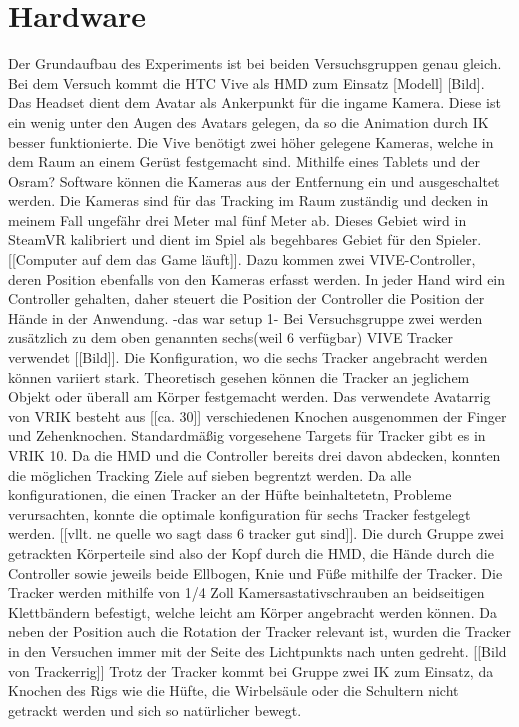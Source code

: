 \section{Hardware}
Der Grundaufbau des Experiments ist bei beiden Versuchsgruppen genau gleich.
Bei dem Versuch kommt die HTC Vive als HMD zum Einsatz [Modell] [Bild]. Das Headset dient dem Avatar als Ankerpunkt für die ingame Kamera. Diese ist ein wenig unter den Augen des Avatars gelegen, da so die Animation durch IK besser funktionierte.
Die Vive benötigt zwei höher gelegene Kameras, welche in dem Raum an einem Gerüst festgemacht sind. Mithilfe eines Tablets und der Osram? Software können die Kameras aus der Entfernung ein und ausgeschaltet werden. Die Kameras sind für das Tracking im Raum zuständig und decken in meinem Fall ungefähr drei Meter mal fünf Meter ab. Dieses Gebiet wird in SteamVR kalibriert und dient im Spiel als begehbares Gebiet für den Spieler. [[Computer auf dem das Game läuft]].
Dazu kommen zwei VIVE-Controller, deren Position ebenfalls von den Kameras erfasst werden. In jeder Hand wird ein Controller gehalten, daher steuert die Position der Controller die Position der Hände in der Anwendung. 
-das war setup 1-
Bei Versuchsgruppe zwei werden zusätzlich zu dem oben genannten sechs(weil 6 verfügbar) VIVE Tracker verwendet [[Bild]]. Die Konfiguration, wo die sechs Tracker angebracht werden können variiert stark. Theoretisch gesehen können die Tracker an jeglichem Objekt oder überall am Körper festgemacht werden. Das verwendete Avatarrig von VRIK besteht aus [[ca. 30]] verschiedenen Knochen ausgenommen der Finger und Zehenknochen. Standardmäßig vorgesehene Targets für Tracker gibt es in VRIK 10. Da die HMD und die Controller bereits drei davon abdecken, konnten die möglichen Tracking Ziele auf sieben begrentzt werden. Da alle konfigurationen, die einen Tracker an der Hüfte beinhaltetetn, Probleme verursachten, konnte die optimale konfiguration für sechs Tracker festgelegt werden. [[vllt. ne quelle wo sagt dass 6 tracker gut sind]]. Die durch Gruppe zwei getrackten Körperteile sind also der Kopf durch die HMD, die Hände durch die Controller sowie jeweils beide Ellbogen, Knie und Füße mithilfe der Tracker. 
Die Tracker werden mithilfe von 1/4 Zoll Kamersastativschrauben an beidseitigen Klettbändern befestigt, welche leicht am Körper angebracht werden können. Da neben der Position auch die Rotation der Tracker relevant ist, wurden die Tracker in den Versuchen immer mit der Seite des Lichtpunkts nach unten gedreht. [[Bild von Trackerrig]]
Trotz der Tracker kommt bei Gruppe zwei IK zum Einsatz, da Knochen des Rigs wie die Hüfte, die Wirbelsäule oder die Schultern nicht getrackt werden und sich so natürlicher bewegt.

